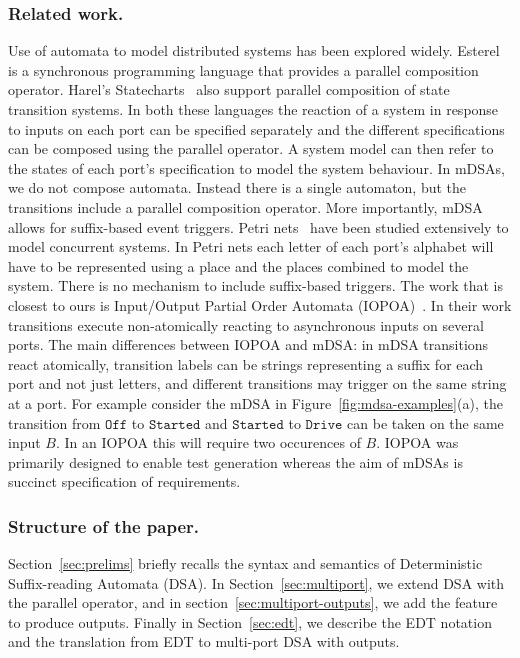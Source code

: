 \subsubsection*{Related work.}
Use of automata to model distributed systems has been explored widely.
Esterel~\cite{DBLP:journals/scp/BerryG92} is a synchronous programming language
that provides a parallel composition operator. Harel's
Statecharts~\cite{DBLP:journals/scp/Harel87} also support parallel composition
of state transition systems. In both these languages the reaction of a system
in response to inputs on each port can be specified separately and the
different specifications can be composed using the parallel operator. A system
model can then refer to the states of each port's specification to model the
system behaviour. In mDSAs, we do not compose automata. Instead there is a single automaton, but the transitions include a parallel composition operator. More importantly, mDSA allows for suffix-based event triggers. %
Petri nets~\cite{CAPetri}
have been studied extensively to model concurrent systems. In Petri nets each
letter of each port's alphabet will have to be represented using a place and
the places combined to model the system. There is no mechanism to include suffix-based triggers. %
The work that is closest to ours is Input/Output Partial Order
Automata (IOPOA)~\cite{10.5555/2391293.2391305}. In their work transitions
execute non-atomically reacting to asynchronous inputs on several ports. The
main differences between IOPOA and mDSA: in mDSA transitions react
atomically, transition labels can be strings representing a suffix for each port and not just letters,
and different transitions may trigger on the same string at a port. For example consider the mDSA in Figure~\ref{fig:mdsa-examples}(a), the transition from $\mathtt{Off}$ to $\mathtt{Started}$ and $\mathtt{Started}$ to $\mathtt{Drive}$ can be taken on the same input $B$. In an IOPOA this will require two occurences of $B$. IOPOA was primarily designed to enable test generation whereas the aim of mDSAs is succinct specification of requirements.

\subsubsection*{Structure of the paper.} Section~\ref{sec:prelims} briefly recalls the syntax and semantics of Deterministic Suffix-reading Automata (DSA). In Section~\ref{sec:multiport}, we extend DSA with the parallel operator, and in section~\ref{sec:multiport-outputs}, we add the feature to produce outputs. Finally in Section~\ref{sec:edt}, we describe the EDT notation and the translation from EDT to multi-port DSA with outputs. 